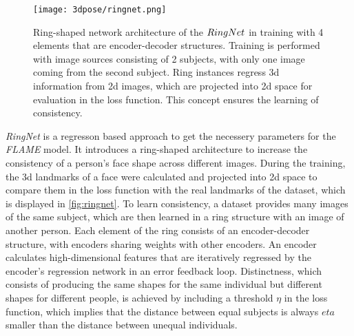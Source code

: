 \begin{figure}[h]
	\centering
	\texttt{[image: 3dpose/ringnet.png]}
	\caption{Ring-shaped network architecture of the $\protect RingNet$ in training with 4 elements that are encoder-decoder structures. Training is performed with image sources consisting of 2 subjects, with only one image coming from the second subject. Ring instances regress 3d information from 2d images, which are projected into 2d space for evaluation in the loss function. This concept ensures the learning of consistency.\cite{ringnet}}
	\label{fig:ringnet}
\end{figure}

\emph{RingNet} is a regresson based approach to get the necessery parameters for the \emph{FLAME} model. It introduces a ring-shaped architecture to increase the consistency of a person's face shape across different images. During the training, the 3d landmarks of a face were calculated and projected into 2d space to compare them in the loss function with the real landmarks of the dataset, which is displayed in \autoref{fig:ringnet}. To learn consistency, a dataset provides many images of the same subject, which are then learned in a ring structure with an image of another person. Each element of the ring consists of an encoder-decoder structure, with encoders sharing weights with other encoders. An encoder calculates high-dimensional features that are iteratively regressed by the encoder's regression network in an error feedback loop. Distinctness, which consists of producing the same shapes for the same individual but different shapes for different people, is achieved by including a threshold $\eta$ in the loss function, which implies that the distance between equal subjects is always $eta$ smaller than the distance between unequal individuals. \cite{ringnet}

